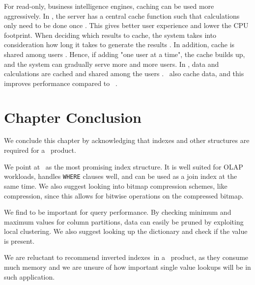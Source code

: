 For read-only, business intelligence engines, caching can be used more aggressively. In \qlikview, the server has a central cache function such that calculations only need to be done once \cite{Qlik2011-ef}. This gives better user experience and lower the CPU footprint. When deciding which results to cache, the system takes into consideration how long it takes to generate the results \cite{noauthor_undateds-js}. In addition, cache is shared among users \cite{Qlik2011-yc}. Hence, if adding "one user at a time", the cache builds up, and the system can gradually serve more and more users. In \tableau, data and calculations are cached and shared among the users \cite{Kamkolkar2015-iq}. \vertipaq~also cache data, and this improves performance compared to \mssql~\cite{Ferrari2012-hm}.


\section{Chapter Conclusion}
\label{sec:Chapter Conclusion}
We conclude this chapter by acknowledging that indexes and other structures are required for a \bd~product.

We point at \biti~as the most promising index structure. It is well suited for OLAP workloads, handles \texttt{WHERE} clauses well, and can be used as a join index at the same time. We also suggest looking into bitmap compression schemes, like  compression, since this allows for bitwise operations on the compressed bitmap.

We find  to be important for query performance. By checking minimum and maximum values for column partitions, data can easily be pruned by exploiting local clustering. We also suggest looking up the dictionary and check if the value is present.


We are reluctant to recommend inverted indexes~in a \bd~product, as they consume much memory and we are unsure of how important single value lookups will be in such application.

